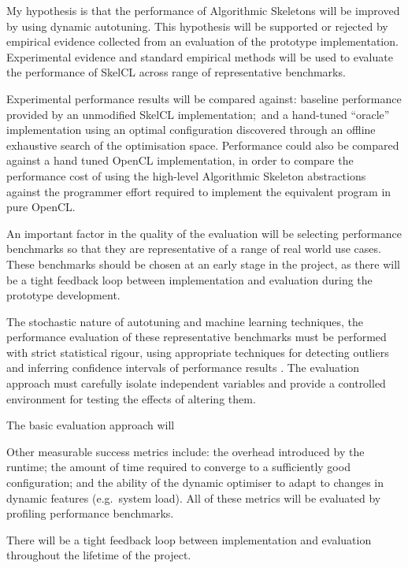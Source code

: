My hypothesis is that the performance of Algorithmic Skeletons will be
improved by using dynamic autotuning. This hypothesis will be
supported or rejected by empirical evidence collected from an
evaluation of the prototype implementation. Experimental evidence and
standard empirical methods will be used to evaluate the performance of
SkelCL across range of representative benchmarks.

Experimental performance results will be compared against: baseline
performance provided by an unmodified SkelCL implementation;\ and a
hand-tuned ``oracle'' implementation using an optimal configuration
discovered through an offline exhaustive search of the optimisation
space. Performance could also be compared against a hand tuned OpenCL
implementation, in order to compare the performance cost of using the
high-level Algorithmic Skeleton abstractions against the programmer
effort required to implement the equivalent program in pure OpenCL.

An important factor in the quality of the evaluation will be selecting
performance benchmarks so that they are representative of a range of
real world use cases. These benchmarks should be chosen at an early
stage in the project, as there will be a tight feedback loop between
implementation and evaluation during the prototype development.

The stochastic nature of autotuning and machine learning techniques,
the performance evaluation of these representative benchmarks must be
performed with strict statistical rigour, using appropriate techniques
for detecting outliers and inferring confidence intervals of
performance results \cite{Georges2007}. The evaluation approach must
carefully isolate independent variables and provide a controlled
environment for testing the effects of altering them.

The basic evaluation approach will

Other measurable success metrics include: the overhead introduced by
the runtime; the amount of time required to converge to a sufficiently
good configuration; and the ability of the dynamic optimiser to adapt
to changes in dynamic features (e.g.\ system load). All of these
metrics will be evaluated by profiling performance benchmarks.


There will be a tight feedback loop between implementation and
evaluation throughout the lifetime of the project.
